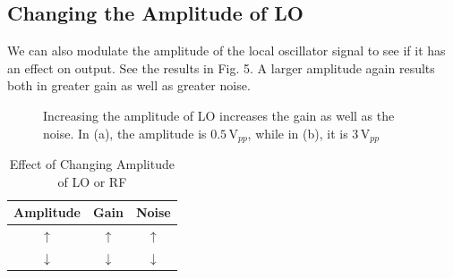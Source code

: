 \documentclass[lettersize,journal]{IEEEtran}
\begin{document}
\subsection{Changing the Amplitude of LO}

We can also modulate the amplitude of the local oscillator signal to see if it has an effect on output. See the results in Fig. 5. A larger amplitude again results both in greater gain as well as greater noise.

\begin{figure}[!t]
\centering
{}
\hfil
{}
\caption{Increasing the amplitude of LO increases the gain as well as the noise. In (a), the amplitude is $0.5\,\text{V}_{pp}$, while in (b), it is $3\,\text{V}_{pp}$}
\label{fig_sim}
\end{figure}

\begin{table}
\renewcommand{\arraystretch}{2.2}
\begin{center}
\caption{Effect of Changing Amplitude of LO or RF}
\label{tab1}
\begin{tabular}{c c c}
\hline
\bfseries Amplitude & \bfseries Gain & \bfseries Noise\\
\hline
$\uparrow$ & $\uparrow$ & $\uparrow$\\
\hline
$\downarrow$ & $\downarrow$ & $\downarrow$\\
\hline
\end{tabular}
\end{center}
\end{table}
\end{document}

